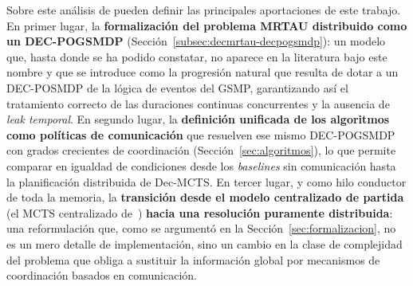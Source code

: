 Sobre este análisis de pueden definir las principales aportaciones de este trabajo. En primer lugar, la \textbf{formalización del problema MRTAU distribuido como un DEC-POGSMDP} (Sección~\ref{subsec:decmrtau-decpogsmdp}): un modelo que, hasta donde se ha podido constatar, no aparece en la literatura bajo este nombre y que se introduce como la progresión natural que resulta de dotar a un DEC-POSMDP de la lógica de eventos del GSMP, garantizando así el tratamiento correcto de las duraciones continuas concurrentes y la ausencia de \emph{leak temporal}. En segundo lugar, la \textbf{definición unificada de los algoritmos como políticas de comunicación} que resuelven ese mismo DEC-POGSMDP con grados crecientes de coordinación (Sección~\ref{sec:algoritmos}), lo que permite comparar en igualdad de condiciones desde los \textit{baselines} sin comunicación hasta la planificación distribuida de Dec-MCTS. En tercer lugar, y como hilo conductor de toda la memoria, la \textbf{transición desde el modelo centralizado de partida} (el MCTS centralizado de~) \textbf{hacia una resolución puramente distribuida}: una reformulación que, como se argumentó en la Sección~\ref{sec:formalizacion}, no es un mero detalle de implementación, sino un cambio en la clase de complejidad del problema que obliga a sustituir la información global por mecanismos de coordinación basados en comunicación.